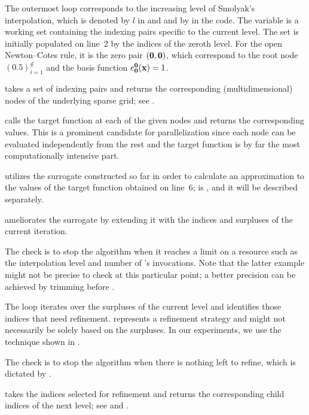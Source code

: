 \begin{compactlist}

 The outermost loop corresponds to the increasing level of
Smolyak's interpolation, which is denoted by $l$ in  and
 and by  in the code. The 
variable is a working set containing the indexing pairs specific to the current
level. The set is initially populated on line~2 by the indices of the zeroth
level. For the open Newton--Cotes rule, it is the zero pair $(\mathbf{0}, \mathbf{0})$,
which correspond to the root node $(0.5)_{i = 1}^\nin$ and the basis function
$e^{\mathbf{0}}_{\mathbf{0}}(\mathbf{x}) = 1$.

  takes a set of indexing pairs and returns
the corresponding (multidimensional) nodes of the underlying sparse grid; see
.

  calls the target function at each of the given
nodes and returns the corresponding values. This is a prominent candidate for
parallelization since each node can be evaluated independently from the rest and
the target function is by far the most computationally intensive part.

  utilizes the surrogate constructed so far in
order to calculate an approximation to the values of the target function
obtained on line~6;  is , and it will be
described separately.

  ameliorates the surrogate by extending it with
the indices and surpluses of the current iteration.

 The check is to stop the algorithm when it reaches a limit on a
resource such as the interpolation level and number of 's
invocations. Note that the latter example might not be precise to check at this
particular point; a better precision can be achieved by trimming 
before .

 The loop iterates over the surpluses of the current level and
identifies those indices that need refinement.  represents a
refinement strategy and might not necessarily be solely based on the surpluses.
In our experiments, we use the technique shown in .

 The check is to stop the algorithm when there is nothing left
to refine, which is dictated by .

  takes the indices selected for
refinement and returns the corresponding child indices of the next level; see
 and .

\end{compactlist}

